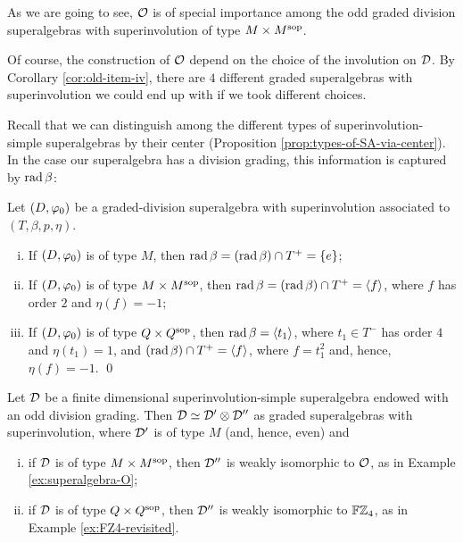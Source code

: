 As we are going to see, $\mathcal O$ is of special importance among the odd graded division superalgebras with superinvolution of type $M\times M^{\mathrm{sop}}$.


Of course, the construction of $\mathcal O$ depend on the choice of the involution on $\mathcal{D}$. 
By Corollary \ref{cor:old-item-iv}, there are $4$ different graded superalgebras with superinvolution we could end up with if we took different choices.


Recall that we can distinguish among the different types of superinvolution-simple superalgebras by their center (Proposition \ref{prop:types-of-SA-via-center}). 
In the case our superalgebra has a division grading, this information is captured by $\operatorname{rad} \beta$:

\begin{lemma}\label{lemma:types-of-D-via-rad-beta}
    Let $(D, \varphi_0)$ be a graded-division superalgebra with superinvolution associated to $(T, \beta, p, \eta)$.
    \begin{enumerate}[(i)]
        \item If $(D, \varphi_0)$ is of type $M$, then $\operatorname{rad} \beta = (\operatorname{rad} \beta) \cap T^+ = \{e\}$;
        \item If $(D, \varphi_0)$ is of type $M\times M^{\mathrm{sop}}$, then $\operatorname{rad} \beta = (\operatorname{rad} \beta) \cap T^+ = \langle f \rangle$, where $f$ has order $2$ and $\eta(f) = -1$;
        \item If $(D, \varphi_0)$ is of type $Q\times Q^{\mathrm{sop}}$, then $\operatorname{rad} \beta = \langle t_1 \rangle$, where $t_1 \in T^-$ has order $4$ and $\eta(t_1) = 1$, and $(\operatorname{rad} \beta) \cap T^+ = \langle f \rangle$, where $f = t_1^2$ and, hence, $\eta(f) = -1$. \qed
    \end{enumerate}
\end{lemma}

\begin{thm}
    Let $\mathcal{D}$ be a finite dimensional superinvolution-simple superalgebra endowed with an odd division grading. 
    Then $\mathcal{D} \simeq \mathcal{D}' \otimes \mathcal{D}''$ as graded superalgebras with superinvolution, where $\mathcal{D}'$ is of type $M$ (and, hence, even) and
    \begin{enumerate}[(i)]
        \item if $\mathcal{D}$ is of type $M\times M^{\mathrm{sop}}$, then $\mathcal{D}''$ is weakly isomorphic to $\mathcal O$, as in Example \ref{ex:superalgebra-O};
        \item if $\mathcal{D}$ is of type $Q\times Q^{\mathrm{sop}}$, then $\mathcal{D}''$ is weakly isomorphic to $\mathbb{F}\mathbb{Z}_4$, as in Example \ref{ex:FZ4-revisited}.
    \end{enumerate}
\end{thm}

